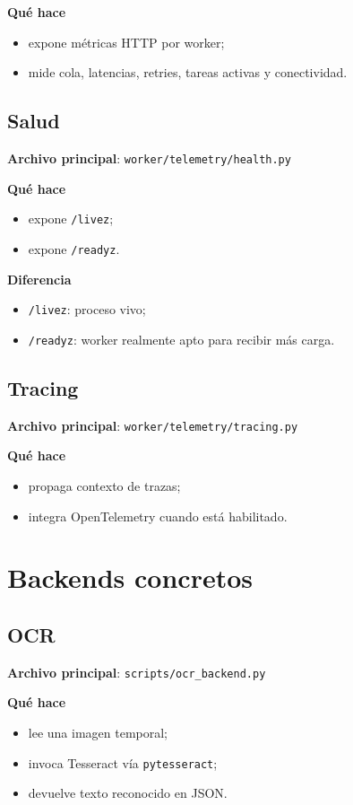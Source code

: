 \documentclass[11pt]{article}
\begin{document}
\textbf{Qué hace}
\begin{itemize}
\item expone métricas HTTP por worker;
\item mide cola, latencias, retries, tareas activas y conectividad.
\end{itemize}

\subsection{Salud}
\textbf{Archivo principal}: \texttt{worker/telemetry/health.py}

\textbf{Qué hace}
\begin{itemize}
\item expone \texttt{/livez};
\item expone \texttt{/readyz}.
\end{itemize}

\textbf{Diferencia}
\begin{itemize}
\item \texttt{/livez}: proceso vivo;
\item \texttt{/readyz}: worker realmente apto para recibir más carga.
\end{itemize}

\subsection{Tracing}
\textbf{Archivo principal}: \texttt{worker/telemetry/tracing.py}

\textbf{Qué hace}
\begin{itemize}
\item propaga contexto de trazas;
\item integra OpenTelemetry cuando está habilitado.
\end{itemize}

\section{Backends concretos}

\subsection{OCR}
\textbf{Archivo principal}: \texttt{scripts/ocr\_backend.py}

\textbf{Qué hace}
\begin{itemize}
\item lee una imagen temporal;
\item invoca Tesseract vía \texttt{pytesseract};
\item devuelve texto reconocido en JSON.
\end{itemize}
\end{document}
